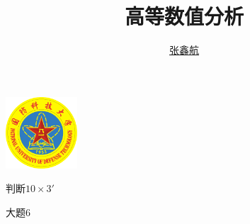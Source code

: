 \documentclass[cn,blue,12pt,normal]{elegantnote}
\title{高等数值分析}
\author{\href{mailto:zhangxinhang19@foxmail.com}{张鑫航}}
\institute{国防科技大学}
\date{\zhtoday}
\begin{document}
\maketitle
\centerline{
  \includegraphics[width=0.2\textwidth]{figure/logo.pdf}
}
判断$10\times 3'$

大题$6$

\newpage
\tableofcontents
\newpage











\end{document}
